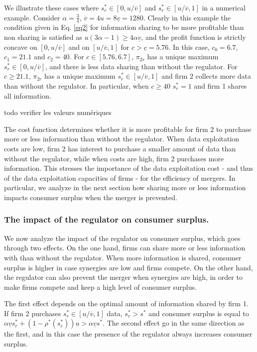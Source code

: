\documentclass[a4paper,leqno]{article}%
\renewcommand{\a}{\alpha}
\newcommand{\uv}{\underline{v}}
\newcommand{\ov}{\overline{v}}
\begin{document}
\medskip

We illustrate these cases where $s_r^*\in[0,u/\ov]$ and $s_r^*\in[u/\ov,1]$ in a numerical example. Consider $\a=\frac{3}{4}$, $\ov=4u=8\uv=1280$. Clearly in this example the condition given in Eq. \ref{eq2} for information sharing to be more profitable than non sharing is satisfied as $u(3\a-1)\geq 4\a\uv$, and the profit function is strictly concave on $[0,u/\ov]$ and on $[u/\ov,1]$ for $c>\underline{c}=5.76$. In this case, $c_0=6.7$, $c_1=21.1$ and $c_2=40$. For $c\in[5.76,6.7]$, $\pi_{2r}$ has a unique maximum $s_r^*\in[0,u/\ov]$, and there is less data sharing than without the regulator. For $c\geq21.1$, $\pi_{2r}$ has a unique maximum $s_r^*\in[u/\ov,1]$ and firm 2 collects more data than without the regulator. In particular, when $c\geq 40$ $s^*_r=1$ and firm 1 shares all information. 

todo verifier les valeurs numériques

\medskip

The cost function determines whether it is more profitable for firm 2 to purchase more or less information than without the regulator. When data exploitation costs are low, firm 2 has interest to purchase a smaller amount of data than without the regulator, while when costs are high, firm 2 purchases more information. This stresses the importance of the data exploitation cost - and thus of the data exploitation capacities of firms - for the efficiency of mergers. In particular, we analyze in the next section how sharing more or less information impacts consumer surplus when the merger is prevented.

\medskip

\subsubsection{The impact of the regulator on consumer surplus.}

We now analyze the impact of the regulator on consumer surplus, which goes through two effects. On the one hand, firms can share more or less information with than without the regulator. When more information is shared, consumer surplus is higher in case synergies are low and firms compete. On the other hand, the regulator can also prevent the merger when synergies are high, in order to make firms compete and keep a high level of consumer surplus. 

\medskip

The first effect depends on the optimal amount of information shared by firm 1. If firm 2 purchases $s_r^*\in[u/\ov,1]$ data, $s_r^*>s^*$ and consumer surplus is equal to $\a \uv s_r^*+(1-\rho^*(s_r^*))u>\a \uv s^*$. The second effect go in the same direction as the first, and in this case the presence of the regulator always increases consumer surplus. 
\end{document}
